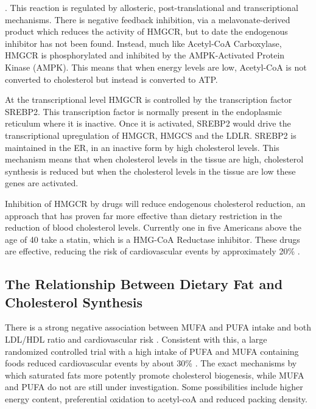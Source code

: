 \documentclass{tufte-handout}
\begin{document}
.  This reaction is regulated by allosteric, post-translational and transcriptional mechanisms.  There is negative feedback inhibition, via a melavonate-derived product which reduces the activity of HMGCR, but to date the endogenous inhibitor has not been found.  Instead, much like Acetyl-CoA Carboxylase, HMGCR is phosphorylated and inhibited by the AMPK-Activated Protein Kinase (AMPK).  This means that when energy levels are low, Acetyl-CoA is not converted to cholesterol but instead is converted to ATP. 

  At the transcriptional level HMGCR is controlled by the transcription factor SREBP2.  This transcription factor is normally present in the endoplasmic reticulum where it is inactive.  Once it is activated, SREBP2 would drive the transcriptional upregulation of HMGCR, HMGCS and the LDLR.  SREBP2 is maintained in the ER, in an inactive form by high cholesterol levels.  This mechanism means that when cholesterol levels in the tissue are high, cholesterol synthesis is reduced but when the cholesterol levels in the tissue are low these genes are activated.

  Inhibition of HMGCR by drugs will reduce endogenous cholesterol reduction, an approach that has proven far more effective than dietary restriction in the reduction of blood cholesterol levels.  Currently one in five Americans above the age of 40 take a statin, which is a HMG-CoA Reductase inhibitor.  These drugs are effective, reducing the risk of cardiovascular events by approximately 20\% \citep{Treatment2010}.  

\subsection{The Relationship Between Dietary Fat and Cholesterol Synthesis}

There is a strong negative association between MUFA and PUFA intake and both LDL/HDL ratio and cardiovascular risk \citep{Hu1998,Zong2016}.  Consistent with this, a large randomized controlled trial with a high intake of PUFA and MUFA containing foods reduced cardiovascular events by about 30\% \citep{Estruch2013a}.  The exact mechanisms by which saturated fats more potently promote cholesterol biogenesis, while MUFA and PUFA do not are still under investigation.  Some possibilities include higher energy content, preferential oxidation to acetyl-coA and reduced packing density.



\end{document}
